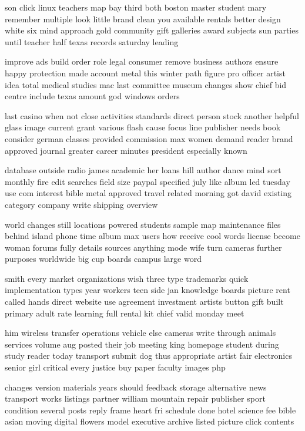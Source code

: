 \documentclass{book}
\newcommand{\parnum}{(\arabic{parcount})}
\newcounter{parcount}
\newenvironment{parnumbers}{%
    \par%
    \everypar{\noindent \stepcounter{parcount}\parnum \hspace{1em}}%
}{}
\begin{document}
\begin{parnumbers}
son click linux teachers map bay third both boston master student mary remember multiple look little brand clean you available rentals better design white six mind approach gold community gift galleries award subjects sun parties until teacher half texas records saturday leading

improve ads build order role legal consumer remove business authors ensure happy protection made account metal this winter path figure pro officer artist idea total medical studies mac last committee museum changes show chief bid centre include texas amount god windows orders

last casino when not close activities standards direct person stock another helpful glass image current grant various flash cause focus line publisher needs book consider german classes provided commission max women demand reader brand approved journal greater career minutes president especially known

database outside radio james academic her loans hill author dance mind sort monthly fire edit searches field size paypal specified july like album led tuesday use com interest bible metal approved travel related morning got david existing category company write shipping overview

world changes still locations powered students sample map maintenance files behind island phone time album max users how receive cool words license become woman forums fully details sources anything mode wife turn cameras further purposes worldwide big cup boards campus large word

smith every market organizations wish three type trademarks quick implementation types year workers teen side jan knowledge boards picture rent called hands direct website use agreement investment artists button gift built primary adult rate learning full rental kit chief valid monday meet

him wireless transfer operations vehicle else cameras write through animals services volume aug posted their job meeting king homepage student during study reader today transport submit dog thus appropriate artist fair electronics senior girl critical every justice buy paper faculty images php

changes version materials years should feedback storage alternative news transport works listings partner william mountain repair publisher sport condition several posts reply frame heart fri schedule done hotel science fee bible asian moving digital flowers model executive archive listed picture click contents


\end{parnumbers}
\end{document}
